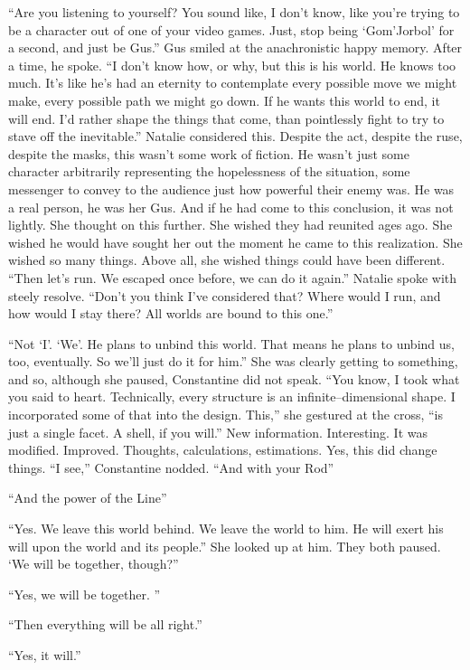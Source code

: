 “Are you listening to yourself? You sound like, I don’t know, like you’re trying to be a character out of one of your video games. Just, stop being ‘Gom’Jorbol’ for a second, and just be Gus.”
\SmallVSpace
Gus smiled at the anachronistic happy memory. After a time, he spoke. “I don’t know how, or why, but this is his world. He knows too much. It’s like he’s had an eternity to contemplate every possible move we might make, every possible path we might go down. If he wants this world to end, it will end. I’d rather shape the things that come, than pointlessly fight to try to stave off the inevitable.”
\SmallVSpace
Natalie considered this. Despite the act, despite the ruse, despite the masks, this wasn’t some work of fiction. He wasn’t just some character arbitrarily representing the hopelessness of the situation, some messenger to convey to the audience just how powerful their enemy was. He was a real person, he was her Gus. And if he had come to this conclusion, it was not lightly.
\newpage
She thought on this further. She wished they had reunited ages ago. She wished he would have sought her out the moment he came to this realization. She wished so many things. Above all, she wished things could have been different.
\SmallVSpace
“Then let’s run. We escaped once before, we can do it again.” Natalie spoke with steely resolve.
\SmallVSpace
“Don’t you think I’ve considered that? Where would I run, and how would I stay there? All worlds are bound to this one.”

“Not ‘I’. ‘We’. He plans to unbind this world. That means he plans to unbind us, too, eventually. So we’ll just do it for him.” She was clearly getting to something, and so, although she paused, Constantine did not speak. “You know, I took what you said to heart. Technically, every structure is an infinite\mbox{--}dimensional shape. I incorporated some of that into the design. This,” she gestured at the cross, “is just a single facet. A shell, if you will.”
\SmallVSpace
New information. Interesting. It was modified. Improved. Thoughts, calculations, estimations. Yes, this did change things. “I see,” Constantine nodded.
\SmallVSpace
“And with your Rod{\el}”

“And the power of the Line{\el}”

“Yes. We leave this world behind. We leave the world to him. He will exert his will upon the world and its people.” She looked up at him. They both paused.
\SomeVSpace
‘We will be together, though?”

“Yes, we will be together. ”

“Then everything will be all right.”

“Yes, it will.”
